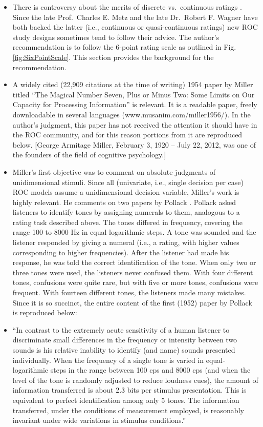 \documentclass[
]{book}
\begin{document}
\begin{itemize}
\item
  There is controversy about the merits of discrete vs.~continuous ratings \citep{RN99, RN2179}. Since the late Prof.~Charles E. Metz and the late Dr.~Robert F. Wagner have both backed the latter (i.e., continuous or quasi-continuous ratings) new ROC study designs sometimes tend to follow their advice. The author's recommendation is to follow the 6-point rating scale as outlined in Fig. \ref{fig:SixPointScale}. This section provides the background for the recommendation.
\item
  A widely cited (22,909 citations at the time of writing) 1954 paper by Miller \citep{RN930} titled ``The Magical Number Seven, Plus or Minus Two: Some Limits on Our Capacity for Processing Information'' is relevant. It is a readable paper, freely downloadable in several languages (www.musanim.com/miller1956/). In the author's judgment, this paper has not received the attention it should have in the ROC community, and for this reason portions from it are reproduced below. {[}George Armitage Miller, February 3, 1920 -- July 22, 2012, was one of the founders of the field of cognitive psychology.{]}
\item
  Miller's first objective was to comment on absolute judgments of unidimensional stimuli. Since all (univariate, i.e., single decision per case) ROC models assume a unidimensional decision variable, Miller's work is highly relevant. He comments on two papers by Pollack \citep{RN2476, RN2474}. Pollack asked listeners to identify tones by assigning numerals to them, analogous to a rating task described above. The tones differed in frequency, covering the range 100 to 8000 Hz in equal logarithmic steps. A tone was sounded and the listener responded by giving a numeral (i.e., a rating, with higher values corresponding to higher frequencies). After the listener had made his response, he was told the correct identification of the tone. When only two or three tones were used, the listeners never confused them. With four different tones, confusions were quite rare, but with five or more tones, confusions were frequent. With fourteen different tones, the listeners made many mistakes. Since it is so succinct, the entire content of the first (1952) paper by Pollack is reproduced below:
\item
  ``In contrast to the extremely acute sensitivity of a human listener to discriminate small differences in the frequency or intensity between two sounds is his relative inability to identify (and name) sounds presented individually. When the frequency of a single tone is varied in equal‐logarithmic steps in the range between 100 cps and 8000 cps (and when the level of the tone is randomly adjusted to reduce loudness cues), the amount of information transferred is about 2.3 bits per stimulus presentation. This is equivalent to perfect identification among only 5 tones. The information transferred, under the conditions of measurement employed, is reasonably invariant under wide variations in stimulus conditions.''

\end{itemize}
\end{document}
